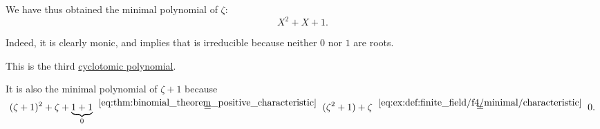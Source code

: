 \begin{example}
\begin{thmenum}
    We have thus obtained the minimal polynomial of \( \zeta \):
    \begin{equation}\label{eq:ex:def:finite_field/f4/minimal}
      X^2 + X + 1.
    \end{equation}

    Indeed, it is clearly monic, and  implies that is irreducible because neither \( 0 \) nor \( 1 \) are roots.

    This is the third \hyperref[def:cyclotomic_polynomial]{cyclotomic polynomial}.

    It is also the minimal polynomial of \( \zeta + 1 \) because
    \begin{equation*}
      (\zeta + 1)^2 + \zeta + \underbrace{1 + 1}_0
      \reloset {\eqref{eq:thm:binomial_theorem_positive_characteristic}} =
      (\zeta^2 + 1) + \zeta
      \reloset {\eqref{eq:ex:def:finite_field/f4/minimal/characteristic}} =
      0.
    \end{equation*}
  \end{thmenum}
\end{example}

